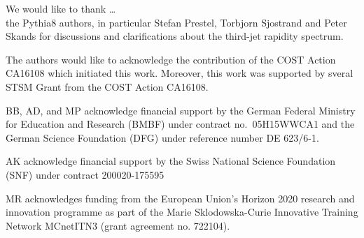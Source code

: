 We would like to thank \ldots \\
the {\sc Pythia8} authors, in particular Stefan Prestel, Torbjorn Sjostrand and Peter Skands for 
discussions and clarifications about the third-jet rapidity spectrum. 

The authors would like to acknowledge the contribution of the COST Action CA16108 which initiated this work.
Moreover, this work was supported by sveral STSM Grant from the COST Action CA16108.

BB, AD, and MP acknowledge financial support by the
German Federal Ministry for Education and Research (BMBF) under
contract no.~05H15WWCA1 and the German Science Foundation (DFG) under
reference number DE 623/6-1.

AK acknowledge financial support by the Swiss National Science Foundation (SNF) under contract 200020-175595

MR acknowledges funding from the European Union's Horizon 2020 research and innovation programme as part of the Marie Sklodowska-Curie Innovative Training Network MCnetITN3 (grant agreement no. 722104).
